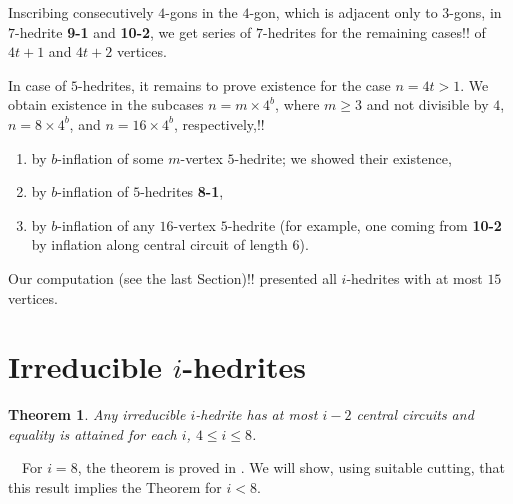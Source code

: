 \documentclass[12pt]{article}
\newtheorem{theorem}{Theorem}
\newcommand{\proof}{\noindent{\bf Proof.}\ \ }
\begin{document}
Inscribing consecutively $4$-gons in the $4$-gon, which is adjacent only to
$3$-gons, in $7$-hedrite {\bf 9-1} and {\bf 10-2}, we get series of 
$7$-hedrites for the remaining cases!! of $4t+1$ and $4t+2$ vertices.

In case of $5$-hedrites, it remains to prove existence for the 
case $n=4t>1$. We obtain existence in the subcases 
$n=m\times 4^b$, where $m\geq 3$ and not divisible by $4$, 
$n=8\times 4^b$, and $n=16\times 4^b$, respectively,!!
\begin{enumerate}
\item by $b$-inflation of some $m$-vertex $5$-hedrite; we showed their existence,
\item by $b$-inflation of $5$-hedrites {\bf 8-1},
\item by $b$-inflation of any $16$-vertex $5$-hedrite (for example, one coming from {\bf 10-2} by inflation along central circuit of length $6$).
\end{enumerate}


 


Our computation (see the last Section)!! presented all $i$-hedrites with at most $15$ vertices. 











\section{Irreducible $i$-hedrites}



\begin{theorem}\label{irre}
Any irreducible $i$-hedrite has at most $i-2$ central circuits and equality is attained for each $i$, $4\leq i\leq 8$.
\end{theorem}
\proof For $i=8$, the theorem is proved in \cite{DSt}. We will show, using suitable cutting, that this result implies the Theorem for $i<8$.
\end{document}
